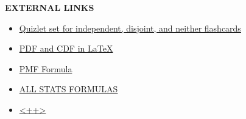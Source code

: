 \documentclass{article}
\begin{document}
\begin{center}

\textbf{EXTERNAL LINKS}

\end{center}

\begin{itemize}
\item \href{https://quizlet.com/144877763/ap-statistics-tps5e-chapter-5-examples-indep-disjoint-neither-flash-cards/}{Quizlet set for independent, disjoint, and neither flashcards}
\item \href{https://tex.stackexchange.com/questions/399717/latex-statistics-cdf-and-pdf}{PDF and CDF in LaTeX}
\item \href{https://www.statisticshowto.datasciencecentral.com/probability-mass-function-pmf/}{PMF Formula}
\item \href{https://stattrek.com/statistics/formulas.aspx}{ALL STATS FORMULAS}
\item \href{<++>}{<++>}
\end{itemize}
\end{document}
